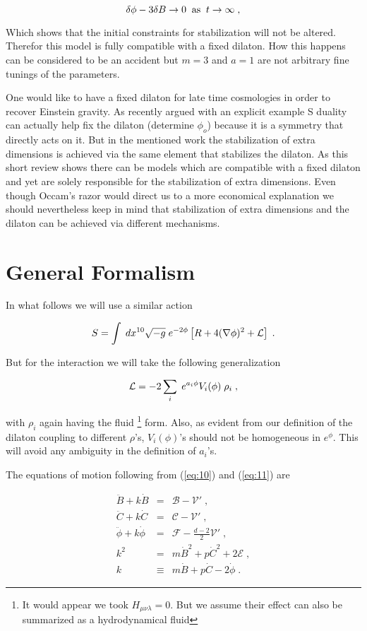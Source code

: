 \documentclass[aps,floatfix,twocolumn,amsmath]{revtex4}
\newcommand{\be}{\begin{equation}}
\newcommand{\ee}{\end{equation}}
\newcommand{\bea}{\begin{eqnarray}}
\newcommand{\eea}{\end{eqnarray}}
\newcommand{\no}{\noindent}
\begin{document}
\[
\delta\phi-3\delta B\to 0 \;\;{\rm as}\;\;t\to\infty\;,
\]

\no Which shows that the initial constraints for stabilization will not be altered. Therefor this model is fully compatible with a fixed dilaton. How this happens can be considered to be an accident but $m=3$ and $a=1$ are not arbitrary fine tunings of the parameters.

One would like to have a fixed dilaton for late time cosmologies in order to recover Einstein gravity. As recently argued \cite{newtr} with an explicit example S duality can actually help fix the dilaton (determine $\phi_{o}$) because it is a symmetry that directly acts on it. But in the mentioned work the stabilization of extra dimensions is achieved via the same element that stabilizes the dilaton. As this short review shows there
can be models which are compatible with a fixed dilaton and yet are solely responsible for the stabilization of extra dimensions. Even though Occam's razor would direct us to a more economical explanation we should nevertheless keep in mind that stabilization of extra dimensions and the dilaton can be achieved via different mechanisms. 

\section{General Formalism}

In what follows we will use a similar action 

\be{\label{eq:10}}
S=\int\;dx^{10}\sqrt{-g}\;e^{-2\phi}\left[R+4(\nabla\phi)^{2}+\mathcal{L}\right]\;.
\ee

\noindent But for the interaction  we will take the following generalization

\be{\label{eq:11}}
\mathcal{L}=-2\sum_{i}\;e^{a_{i}\phi}V_{i}(\phi)\;\rho_{i}\;,
\ee

\no with $\rho_{i}$ again having the fluid \footnote{It would appear we took $H_{\mu\nu\lambda}=0$. But we assume their effect can also be summarized as a hydrodynamical fluid} form. Also, as evident from our definition of the dilaton coupling to different $\rho$'s, $V_{i}(\phi)$'s should not be homogeneous in $e^{\phi}$. This will avoid any ambiguity in the definition of $a_{i}$'s.

The equations of motion following from (\ref{eq:10}) and (\ref{eq:11}) are

\begin{subequations}
\bea
\ddot{B}+k\dot{B}&=&\mathcal{B}-\mathcal{V'}\;,\\
\ddot{C}+k\dot{C}&=&\mathcal{C}-\mathcal{V'}\;,\\
\ddot{\phi}+k\dot{\phi}&=&\mathcal{F}-\frac{d-2}{2}\mathcal{V'}\;,\\
k^{2}&=&m\dot{B}^{2}+p\dot{C}^{2}+2\mathcal{E}\;,\\
k&\equiv&m\dot{B}+p\dot{C}-2\dot{\phi}\;.
\eea
\end{subequations}
\end{document}
